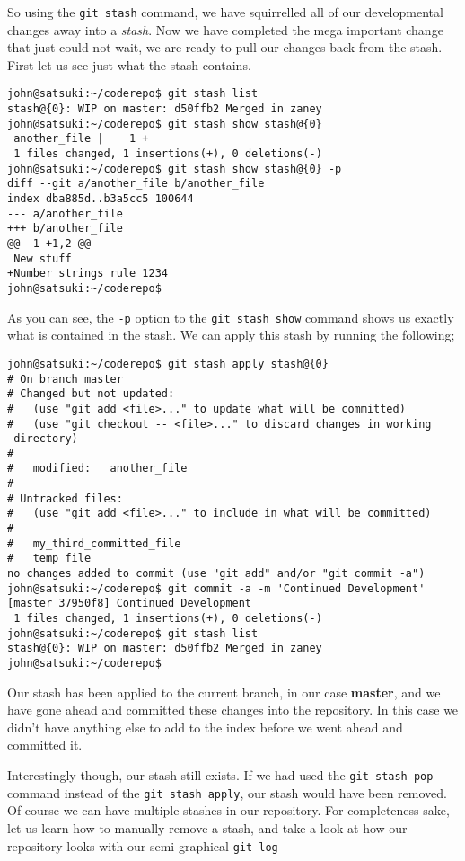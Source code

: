 So using the \texttt{git stash} command, we have squirrelled all of our developmental changes away into a \emph{stash}.  Now we have completed the mega important change that just could not wait, we are ready to pull our changes back from the stash.  First let us see just what the stash contains.

\begin{Verbatim}[frame=leftline,framerule=1mm,fontsize=\relsize{-3}] 
john@satsuki:~/coderepo$ git stash list
stash@{0}: WIP on master: d50ffb2 Merged in zaney
john@satsuki:~/coderepo$ git stash show stash@{0}
 another_file |    1 +
 1 files changed, 1 insertions(+), 0 deletions(-)
john@satsuki:~/coderepo$ git stash show stash@{0} -p
diff --git a/another_file b/another_file
index dba885d..b3a5cc5 100644
--- a/another_file
+++ b/another_file
@@ -1 +1,2 @@
 New stuff
+Number strings rule 1234
john@satsuki:~/coderepo$ 
\end{Verbatim}

As you can see, the \texttt{-p} option to the \texttt{git stash show} command shows us exactly what is contained in the stash.  We can apply this stash by running the following;

\begin{Verbatim}[frame=leftline,framerule=1mm,fontsize=\relsize{-3}] 
john@satsuki:~/coderepo$ git stash apply stash@{0}
# On branch master
# Changed but not updated:
#   (use "git add <file>..." to update what will be committed)
#   (use "git checkout -- <file>..." to discard changes in working 
 directory)
#
#	modified:   another_file
#
# Untracked files:
#   (use "git add <file>..." to include in what will be committed)
#
#	my_third_committed_file
#	temp_file
no changes added to commit (use "git add" and/or "git commit -a")
john@satsuki:~/coderepo$ git commit -a -m 'Continued Development'
[master 37950f8] Continued Development
 1 files changed, 1 insertions(+), 0 deletions(-)
john@satsuki:~/coderepo$ git stash list
stash@{0}: WIP on master: d50ffb2 Merged in zaney
john@satsuki:~/coderepo$ 
\end{Verbatim}

Our stash has been applied to the current branch, in our case \textbf{master}, and we have gone ahead and committed these changes into the repository.  In this case we didn't have anything else to add to the index before we went ahead and committed it.  

Interestingly though, our stash still exists.  If we had used the \texttt{git stash pop} command instead of the \texttt{git stash apply}, our stash would have been removed.  Of course we can have multiple stashes in our repository.  For completeness sake, let us learn how to manually remove a stash, and take a look at how our repository looks with our semi-graphical \texttt{git log}

